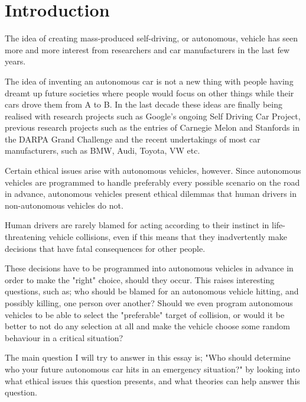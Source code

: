 \chapter{Introduction}
The idea of creating mass-produced self-driving, or autonomous, vehicle has seen more and more interest from researchers and car manufacturers in the last few years.

The idea of inventing an autonomous car is not a new thing with people having dreamt up future societies where people would focus on other things while their cars drove them from A to B. In the last decade these ideas are finally being realised with research projects such as Google's ongoing Self Driving Car Project, previous research projects such as the entries of Carnegie Melon and Stanfords in the DARPA Grand Challenge and the recent undertakings of most car manufacturers, such as BMW, Audi, Toyota, VW etc.  

\newpar Certain ethical issues arise with autonomous vehicles, however. Since autonomous vehicles are programmed to handle preferably every possible scenario on the road in advance, autonomous vehicles present ethical dilemmas that human drivers in non-autonomous vehicles do not. 

\newpar Human drivers are rarely blamed for acting according to their instinct in life-threatening vehicle collisions, even if this means that they inadvertently make decisions that have fatal consequences for other people. 

These decisions have to be programmed into autonomous vehicles in advance in order to make the "right" choice, should they occur. 
This raises interesting questions, such as; who should be blamed for an autonomous vehicle hitting, and possibly killing, one person over another? Should we even program autonomous vehicles to be able to select the "preferable" target of collision, or would it be better to not do any selection at all and make the vehicle choose some random behaviour in a critical situation?

The main question I will try to answer in this essay is; "Who should determine who your future autonomous car hits in an emergency situation?" by looking into what ethical issues this question presents, and what theories can help answer this question.  